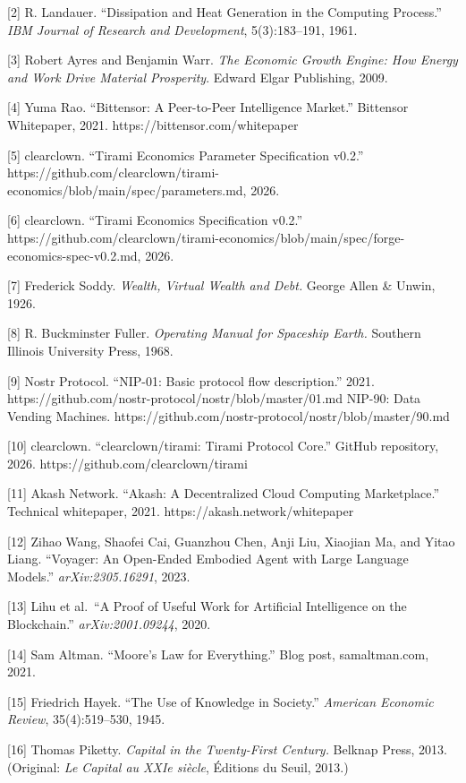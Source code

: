 \documentclass[
  11pt,
]{article}
\begin{document}
{[}2{]} R. Landauer. ``Dissipation and Heat Generation in the Computing
Process.'' \emph{IBM Journal of Research and Development},
5(3):183--191, 1961.

{[}3{]} Robert Ayres and Benjamin Warr. \emph{The Economic Growth
Engine: How Energy and Work Drive Material Prosperity}. Edward Elgar
Publishing, 2009.

{[}4{]} Yuma Rao. ``Bittensor: A Peer-to-Peer Intelligence Market.''
Bittensor Whitepaper, 2021. https://bittensor.com/whitepaper

{[}5{]} clearclown. ``Tirami Economics Parameter Specification v0.2.''
https://github.com/clearclown/tirami-economics/blob/main/spec/parameters.md,
2026.

{[}6{]} clearclown. ``Tirami Economics Specification v0.2.''
https://github.com/clearclown/tirami-economics/blob/main/spec/forge-economics-spec-v0.2.md,
2026.

{[}7{]} Frederick Soddy. \emph{Wealth, Virtual Wealth and Debt.} George
Allen \& Unwin, 1926.

{[}8{]} R. Buckminster Fuller. \emph{Operating Manual for Spaceship
Earth.} Southern Illinois University Press, 1968.

{[}9{]} Nostr Protocol. ``NIP-01: Basic protocol flow description.''
2021. https://github.com/nostr-protocol/nostr/blob/master/01.md NIP-90:
Data Vending Machines.
https://github.com/nostr-protocol/nostr/blob/master/90.md

{[}10{]} clearclown. ``clearclown/tirami: Tirami Protocol Core.'' GitHub
repository, 2026. https://github.com/clearclown/tirami

{[}11{]} Akash Network. ``Akash: A Decentralized Cloud Computing
Marketplace.'' Technical whitepaper, 2021.
https://akash.network/whitepaper

{[}12{]} Zihao Wang, Shaofei Cai, Guanzhou Chen, Anji Liu, Xiaojian Ma,
and Yitao Liang. ``Voyager: An Open-Ended Embodied Agent with Large
Language Models.'' \emph{arXiv:2305.16291}, 2023.

{[}13{]} Lihu et al.~``A Proof of Useful Work for Artificial
Intelligence on the Blockchain.'' \emph{arXiv:2001.09244}, 2020.

{[}14{]} Sam Altman. ``Moore's Law for Everything.'' Blog post,
samaltman.com, 2021.

{[}15{]} Friedrich Hayek. ``The Use of Knowledge in Society.''
\emph{American Economic Review}, 35(4):519--530, 1945.

{[}16{]} Thomas Piketty. \emph{Capital in the Twenty-First Century.}
Belknap Press, 2013. (Original: \emph{Le Capital au XXIe siècle},
Éditions du Seuil, 2013.)
\end{document}
